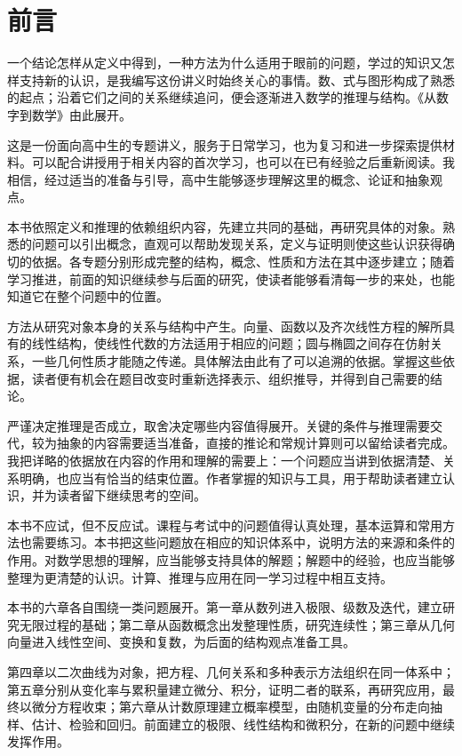 \chapter*{前言}

一个结论怎样从定义中得到，一种方法为什么适用于眼前的问题，学过的知识又怎样支持新的认识，是我编写这份讲义时始终关心的事情。数、式与图形构成了熟悉的起点；沿着它们之间的关系继续追问，便会逐渐进入数学的推理与结构。《从数字到数学》由此展开。

这是一份面向高中生的专题讲义，服务于日常学习，也为复习和进一步探索提供材料。可以配合讲授用于相关内容的首次学习，也可以在已有经验之后重新阅读。我相信，经过适当的准备与引导，高中生能够逐步理解这里的概念、论证和抽象观点。

本书依照定义和推理的依赖组织内容，先建立共同的基础，再研究具体的对象。熟悉的问题可以引出概念，直观可以帮助发现关系，定义与证明则使这些认识获得确切的依据。各专题分别形成完整的结构，概念、性质和方法在其中逐步建立；随着学习推进，前面的知识继续参与后面的研究，使读者能够看清每一步的来处，也能知道它在整个问题中的位置。

方法从研究对象本身的关系与结构中产生。向量、函数以及齐次线性方程的解所具有的线性结构，使线性代数的方法适用于相应的问题；圆与椭圆之间存在仿射关系，一些几何性质才能随之传递。具体解法由此有了可以追溯的依据。掌握这些依据，读者便有机会在题目改变时重新选择表示、组织推导，并得到自己需要的结论。

严谨决定推理是否成立，取舍决定哪些内容值得展开。关键的条件与推理需要交代，较为抽象的内容需要适当准备，直接的推论和常规计算则可以留给读者完成。我把详略的依据放在内容的作用和理解的需要上：一个问题应当讲到依据清楚、关系明确，也应当有恰当的结束位置。作者掌握的知识与工具，用于帮助读者建立认识，并为读者留下继续思考的空间。

本书不应试，但不反应试。课程与考试中的问题值得认真处理，基本运算和常用方法也需要练习。本书把这些问题放在相应的知识体系中，说明方法的来源和条件的作用。对数学思想的理解，应当能够支持具体的解题；解题中的经验，也应当能够整理为更清楚的认识。计算、推理与应用在同一学习过程中相互支持。

\newpage
本书的六章各自围绕一类问题展开。第一章从数列进入极限、级数及迭代，建立研究无限过程的基础；第二章从函数概念出发整理性质，研究连续性；第三章从几何向量进入线性空间、变换和复数，为后面的结构观点准备工具。

第四章以二次曲线为对象，把方程、几何关系和多种表示方法组织在同一体系中；第五章分别从变化率与累积量建立微分、积分，证明二者的联系，再研究应用，最终以微分方程收束；第六章从计数原理建立概率模型，由随机变量的分布走向抽样、估计、检验和回归。前面建立的极限、线性结构和微积分，在新的问题中继续发挥作用。

